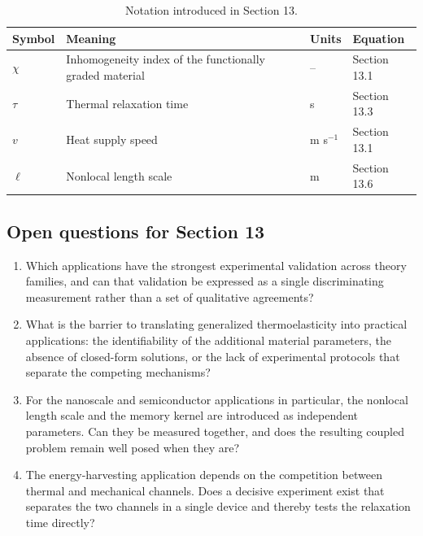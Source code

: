 \begin{table}[htbp]
\centering
\small
\caption{Notation introduced in Section 13.}
\label{tab:notation-sec13}
\begin{tabularx}{\textwidth}{@{}p{1.8cm}X p{2.2cm}p{2.1cm}@{}}
\toprule
\textbf{Symbol} & \textbf{Meaning} & \textbf{Units} & \textbf{Equation} \\
\midrule
$\chi$ & Inhomogeneity index of the functionally graded material & -- & Section 13.1 \\
$\tau$ & Thermal relaxation time & s & Section 13.3 \\
$v$ & Heat supply speed & m s$^{-1}$ & Section 13.1 \\
$\ell$ & Nonlocal length scale & m & Section 13.6 \\
\bottomrule
\end{tabularx}
\end{table}



\subsection{Open questions for Section 13}

\begin{enumerate}[label=\textbf{OQ13.\arabic*}]
\item Which applications have the strongest experimental validation across theory families, and can that validation be expressed as a single discriminating measurement rather than a set of qualitative agreements? \label{oq:13.1}
\item What is the barrier to translating generalized thermoelasticity into practical applications: the identifiability of the additional material parameters, the absence of closed-form solutions, or the lack of experimental protocols that separate the competing mechanisms? \label{oq:13.2}
\item For the nanoscale and semiconductor applications in particular, the nonlocal length scale and the memory kernel are introduced as independent parameters. Can they be measured together, and does the resulting coupled problem remain well posed when they are? \label{oq:13.3}
\item The energy-harvesting application depends on the competition between thermal and mechanical channels. Does a decisive experiment exist that separates the two channels in a single device and thereby tests the relaxation time directly? \label{oq:13.4}
\end{enumerate}

